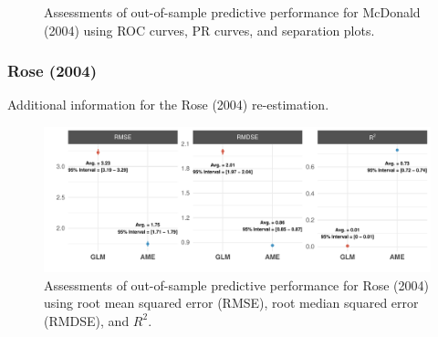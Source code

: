 \begin{figure}
	\centering   
	\caption{Assessments of out-of-sample predictive performance for McDonald (2004) using ROC curves, PR curves, and separation plots.}
\end{figure}
\FloatBarrier
\clearpage

\subsubsection*{Rose (2004)}

Additional information for the Rose (2004) re-estimation.


\FloatBarrier

\begin{figure}
	\centering   
	\includegraphics[width=1\textwidth]{rose_outSample.pdf}
	\caption{Assessments of out-of-sample predictive performance for Rose (2004) using root mean squared error (RMSE), root median squared error (RMDSE), and $R^{2}$.}
\end{figure}
\FloatBarrier
\clearpage

